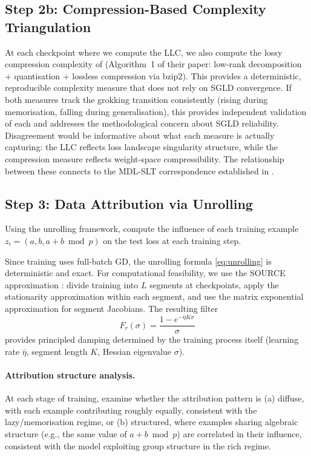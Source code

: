 \documentclass[11pt,a4paper]{article}
\begin{document}
\subsection{Step 2b: Compression-Based Complexity Triangulation}\label{sec:triangulation}

At each checkpoint where we compute the LLC, we also compute the lossy compression complexity of \citet{demoss2025complexity} (Algorithm~1 of their paper: low-rank decomposition + quantisation + lossless compression via bzip2). This provides a deterministic, reproducible complexity measure that does not rely on SGLD convergence. If both measures track the grokking transition consistently (rising during memorisation, falling during generalisation), this provides independent validation of each and addresses the methodological concern about SGLD reliability. Disagreement would be informative about what each measure is actually capturing: the LLC reflects loss landscape singularity structure, while the compression measure reflects weight-space compressibility. The relationship between these connects to the MDL-SLT correspondence established in \citet{hoogland2025compressibility}.

\subsection{Step 3: Data Attribution via Unrolling}\label{sec:unrolling}

Using the unrolling framework, compute the influence of each training example $z_i = (a, b, a{+}b \bmod p)$ on the test loss at each training step.

Since training uses full-batch GD, the unrolling formula \eqref{eq:unrolling} is deterministic and exact. For computational feasibility, we use the SOURCE approximation \citep{bae2024source}: divide training into $L$ segments at checkpoints, apply the stationarity approximation within each segment, and use the matrix exponential approximation for segment Jacobians. The resulting filter
\begin{equation}
    F_r(\sigma) = \frac{1 - e^{-\bar{\eta} K \sigma}}{\sigma}
\end{equation}
provides principled damping determined by the training process itself (learning rate $\bar{\eta}$, segment length $K$, Hessian eigenvalue $\sigma$).

\paragraph{Attribution structure analysis.} At each stage of training, examine whether the attribution pattern is (a) diffuse, with each example contributing roughly equally, consistent with the lazy/memorisation regime, or (b) structured, where examples sharing algebraic structure (e.g., the same value of $a + b \bmod p$) are correlated in their influence, consistent with the model exploiting group structure in the rich regime.
\end{document}
